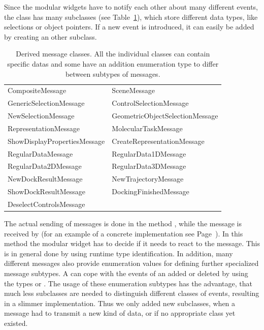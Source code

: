 Since the modular widgets have to notify each other about many different 
events, the class  has many subclasses (see 
Table~\ref{tab:messages}), which store different data types, like selections 
or object pointers. If a new event is introduced, it can easily be added by 
creating an other  subclass.

\begin{table} [bht] %
\centering
\begin{tabular} {|l|l|}
\hline
CompositeMessage             & SceneMessage\\
GenericSelectionMessage      & ControlSelectionMessage\\
NewSelectionMessage          & GeometricObjectSelectionMessage\\
RepresentationMessage        & MolecularTaskMessage\\
ShowDisplayPropertiesMessage & CreateRepresentationMessage\\
RegularDataMessage           & RegularData1DMessage \\
RegularData2DMessage         & RegularData3DMessage\\
NewDockResultMessage         & NewTrajectoryMessage\\
ShowDockResultMessage        & DockingFinishedMessage\\
DeselectControlsMessage      & \\
\hline
\end{tabular}
\caption{Derived message classes. All the individual classes can contain
specific datas and some have an addition enumeration type to differ between
subtypes of messages.}
\label{tab:messages}
\end{table}

The actual sending of messages is done in the method 
, while the message is received by 
 (for an example of a concrete 
implementation see Page~\pageref{onNotify}). In this method the modular widget 
has to decide if it needs to react to the message. This is in general done by 
using runtime type identification. In addition, many different messages also 
provide enumeration values for defining further specialized message subtypes. 
A  can \eg cope with the events of an added or deleted 
 by using the types 
 or 
. The usage of these 
enumeration subtypes has the advantage, that much less subclasses are needed 
to distinguish different classes of events, resulting in a slimmer 
implementation. Thus we only added new  subclasses, when a 
message had to transmit a new kind of data, or if no appropriate class yet 
existed.


